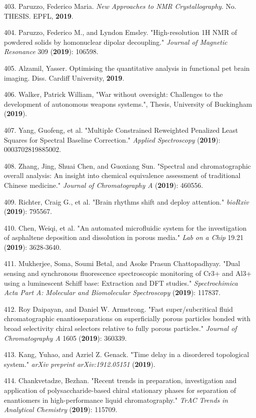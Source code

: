 403. Paruzzo, Federico Maria. \textit{New Approaches to NMR Crystallography}. No. THESIS. EPFL, \textbf{2019}.

404. Paruzzo, Federico M., and Lyndon Emsley. "High-resolution 1H NMR of powdered solids by homonuclear dipolar decoupling." \textit{Journal of Magnetic Resonance} 309 (\textbf{2019}): 106598.

405. Alzamil, Yasser. Optimising the quantitative analysis in functional pet brain imaging. Diss. Cardiff University, \textbf{2019}.

406. Walker, Patrick William, "War without oversight: Challenges to the development of autonomous weapons systems.", Thesis, University of Buckingham (\textbf{2019}).

407. Yang, Guofeng, et al. "Multiple Constrained Reweighted Penalized Least Squares for Spectral Baseline Correction." \textit{Applied Spectroscopy} (\textbf{2019}): 0003702819885002.

408. Zhang, Jing, Shuai Chen, and Guoxiang Sun. "Spectral and chromatographic overall analysis: An insight into chemical equivalence assessment of traditional Chinese medicine." \textit{Journal of Chromatography A} (\textbf{2019}): 460556.

409. Richter, Craig G., et al. "Brain rhythms shift and deploy attention." \textit{bioRxiv} (\textbf{2019}): 795567.

410. Chen, Weiqi, et al. "An automated microfluidic system for the investigation of asphaltene deposition and dissolution in porous media." \textit{Lab on a Chip} 19.21 (\textbf{2019}): 3628-3640.

411. Mukherjee, Soma, Soumi Betal, and Asoke Prasun Chattopadhyay. "Dual sensing and synchronous fluorescence spectroscopic monitoring of Cr3+ and Al3+ using a luminescent Schiff base: Extraction and DFT studies." \textit{Spectrochimica Acta Part A: Molecular and Biomolecular Spectroscopy} (\textbf{2019}): 117837.

412. Roy Daipayan, and Daniel W. Armstrong. "Fast super/subcritical fluid chromatographic enantioseparations on superficially porous particles bonded with broad selectivity chiral selectors relative to fully porous particles." \textit{Journal of Chromatography A} 1605 (\textbf{2019}): 360339.

413. Kang, Yuhao, and Azriel Z. Genack. "Time delay in a disordered topological system." \textit{arXiv preprint arXiv:1912.05151} (\textbf{2019}).

414. Chankvetadze, Bezhan. "Recent trends in preparation, investigation and application of polysaccharide-based chiral stationary phases for separation of enantiomers in high-performance liquid chromatography." \textit{TrAC Trends in Analytical Chemistry} (\textbf{2019}): 115709.

